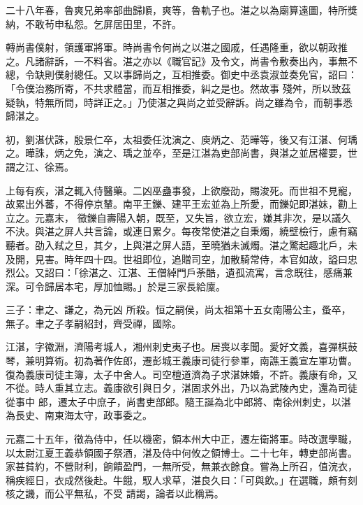 \begin{pinyinscope}
 二十八年春，魯爽兄弟率部曲歸順，爽等，魯軌子也。湛之以為廟算遠圖，特所獎納，不敢茍申私怨。乞屏居田里，不許。



 轉尚書僕射，領護軍將軍。時尚書令何尚之以湛之國戚，任遇隆重，欲以朝政推之。凡諸辭訴，一不料省。湛之亦以《職官記》及令文，尚書令敷奏出內，事無不總，令缺則僕射總任。又以事歸尚之，互相推委。御史中丞袁淑並奏免官，詔曰：「令僕治務所寄，不共求體當，而互相推委，糾之是也。然故事
 殘舛，所以致茲疑執，特無所問，時詳正之。」乃使湛之與尚之並受辭訴。尚之雖為令，而朝事悉歸湛之。



 初，劉湛伏誅，殷景仁卒，太祖委任沈演之、庾炳之、范曄等，後又有江湛、何瑀之。曄誅，炳之免，演之、瑀之並卒，至是江湛為吏部尚書，與湛之並居權要，世謂之江、徐焉。



 上每有疾，湛之輒入侍醫藥。二凶巫蠱事發，上欲廢劭，賜浚死。而世祖不見寵，故累出外蕃，不得停京輦。南平王鑠、建平王宏並為上所愛，而鑠妃即湛妹，勸上立之。元嘉末，
 徵鑠自壽陽入朝，既至，又失旨，欲立宏，嫌其非次，是以議久不決。與湛之屏人共言論，或連日累夕。每夜常使湛之自秉燭，繞壁檢行，慮有竊聽者。劭入弒之旦，其夕，上與湛之屏人語，至曉猶未滅燭。湛之驚起趣北戶，未及開，見害。時年四十四。世祖即位，追贈司空，加散騎常侍，本官如故，謚曰忠烈公。又詔曰：「徐湛之、江湛、王僧綽門戶荼酷，遺孤流寓，言念既往，感痛兼深。可令歸居本宅，厚加恤賜。」於是三家長給廩。



 三子：聿之、謙之，為元凶
 所殺。恒之嗣侯，尚太祖第十五女南陽公主，蚤卒，無子。聿之子孝嗣紹封，齊受禪，國除。



 江湛，字徽淵，濟陽考城人，湘州刺史夷子也。居喪以孝聞。愛好文義，喜彈棋鼓琴，兼明算術。初為著作佐郎，遷彭城王義康司徒行參軍，南譙王義宣左軍功曹。復為義康司徒主簿，太子中舍人。司空檀道濟為子求湛妹婚，不許。義康有命，又不從。時人重其立志。義康欲引與日夕，湛固求外出，乃以為武陵內史，還為司徒從事中
 郎，遷太子中庶子，尚書吏部郎。隨王誕為北中郎將、南徐州刺史，以湛為長史、南東海太守，政事委之。



 元嘉二十五年，徵為侍中，任以機密，領本州大中正，遷左衛將軍。時改選學職，以太尉江夏王義恭領國子祭酒，湛及侍中何攸之領博士。二十七年，轉吏部尚書。家甚貧約，不營財利，餉饋盈門，一無所受，無兼衣餘食。嘗為上所召，值浣衣，稱疾經日，衣成然後赴。牛餓，馭人求草，湛良久曰：「可與飲。」在選職，頗有刻核之譏，而公平無私，不受
 請謁，論者以此稱焉。




\end{pinyinscope}
